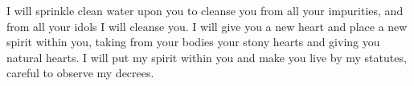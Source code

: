 
\lettrine{I}{} will sprinkle clean water upon you to cleanse you from all your impurities, and from all your idols I will cleanse you. I will give you a new heart and place a new spirit within you, taking from your bodies your stony hearts and giving you natural hearts. I will put my spirit within you and make you live by my statutes, careful to observe my decrees.